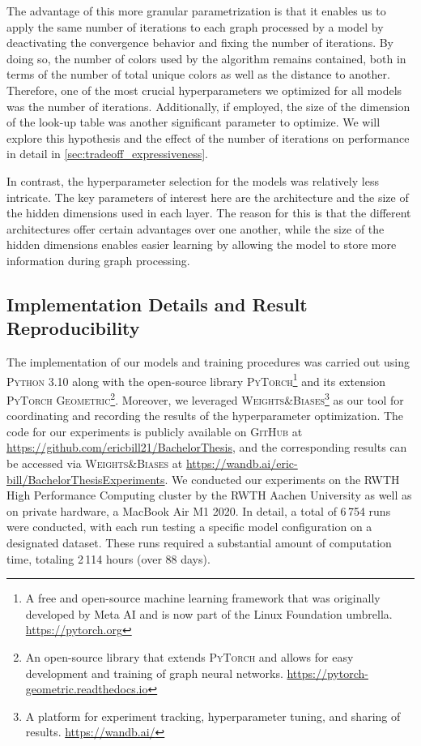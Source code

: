 The advantage of this more granular parametrization is that it enables us to apply the same number of \wl iterations to each graph processed by a \wlnn model by deactivating the convergence behavior and fixing the number of iterations. By doing so, the number of colors used by the \wl algorithm remains contained, both in terms of the number of total unique colors as well as the distance to another. Therefore, one of the most crucial hyperparameters we optimized for all \wlnn models was the number of \wl iterations. Additionally, if employed, the size of the dimension of the look-up table was another significant parameter to optimize. We will explore this hypothesis and the effect of the number of iterations on performance in detail in \cref{sec:tradeoff_expressiveness}.

In contrast, the hyperparameter selection for the \gnn models was relatively less intricate. The key parameters of interest here are the \gnn architecture and the size of the hidden dimensions used in each layer. The reason for this is that the different architectures offer certain advantages over one another, while the size of the hidden dimensions enables easier learning by allowing the model to store more information during graph processing.

\subsection{Implementation Details and Result Reproducibility}
The implementation of our models and training procedures was carried out using \textsc{Python 3.10} along with the open-source library \textsc{PyTorch}\footnote{A free and open-source machine learning framework that was originally developed by Meta AI and is now part of the Linux Foundation umbrella. \href{https://pytorch.org}{https://pytorch.org}} and its extension \textsc{PyTorch Geometric}\footnote{An open-source library that extends \textsc{PyTorch} and allows for easy development and training of graph neural networks. \href{https://pytorch-geometric.readthedocs.io/en/latest}{https://pytorch-geometric.readthedocs.io}}. Moreover, we leveraged \textsc{Weights\&Biases}\footnote{A platform for experiment tracking, hyperparameter tuning, and sharing of results. \href{https://wandb.ai/}{https://wandb.ai/}} as our tool for coordinating and recording the results of the hyperparameter optimization. The code for our experiments is publicly available on \textsc{GitHub} at \url{https://github.com/ericbill21/BachelorThesis}, and the corresponding results can be accessed via \textsc{Weights\&Biases} at \url{https://wandb.ai/eric-bill/BachelorThesisExperiments}. We conducted our experiments on the RWTH High Performance Computing cluster by the RWTH Aachen University as well as on private hardware, a MacBook Air M1 2020. In detail, a total of 6\,754 runs were conducted, with each run testing a specific model configuration on a designated dataset. These runs required a substantial amount of computation time, totaling 2\,114 hours (over 88 days).

